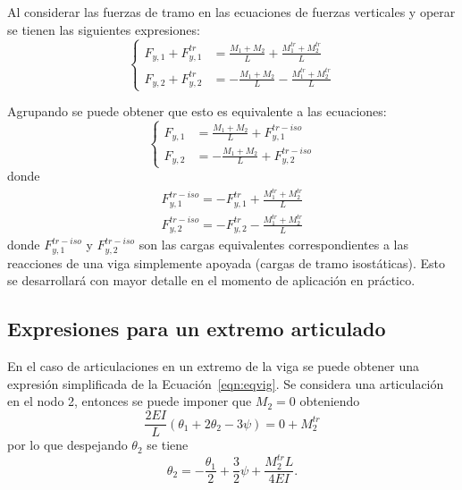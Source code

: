 Al considerar las fuerzas de tramo en las ecuaciones de fuerzas verticales y operar se tienen las siguientes expresiones:
%
\begin{equation}\label{eqn:eccortr}
\left\{
\begin{array}{rl}
\displaystyle
F_{y,1} + F_{y,1}^{tr} & \displaystyle
= \frac{M_1 + M_2}{L} + \frac{M_1^{tr} + M_2^{tr}}{L} \\[5mm]
\displaystyle
F_{y,2} + F_{y,2}^{tr} & \displaystyle
= -\frac{M_1 + M_2}{L} - \frac{M_1^{tr} + M_2^{tr}}{L}
\end{array}
\right.
\end{equation}
%

Agrupando se puede obtener que esto es equivalente a las ecuaciones:
%
\begin{equation}
\boxed{
\left\{
\begin{array}{rl}
\displaystyle
F_{y,1} & \displaystyle
= \frac{M_1 + M_2}{L} + F_{y,1}^{tr-iso} \\[5mm]
\displaystyle
F_{y,2}  & \displaystyle
= -\frac{M_1 + M_2}{L} + F_{y,2}^{tr-iso} 
\end{array}
\right.
}
\end{equation}
%
donde
%
\begin{eqnarray}
F_{y,1}^{tr-iso} = - F_{y,1}^{tr} + \frac{M_1^{tr} + M_2^{tr}}{L} \nonumber\\ 
F_{y,2}^{tr-iso} = -F_{y,2}^{tr}- \frac{M_1^{tr} + M_2^{tr}}{L} \nonumber
\end{eqnarray}
%
donde $F_{y,1}^{tr-iso}$ y $F_{y,2}^{tr-iso}$ son las cargas equivalentes correspondientes a las reacciones de una viga simplemente apoyada (cargas de tramo isostáticas). %
%
Esto se desarrollará con mayor detalle en el momento de aplicación en práctico.



\subsection{Expresiones para un extremo articulado}

En el caso de articulaciones en un extremo de la viga se puede obtener una expresión simplificada de la Ecuación~\eqref{eqn:eqvig}. %
%
Se considera una articulación en el nodo 2, entonces se puede imponer que $M_2=0$ obteniendo  
%
\begin{equation}
\frac{2 EI}{L} \left( \theta_1 + 2  \theta_2 - 3 \psi  \right) = 0 + M_2^{tr}
\end{equation}
%
por lo que despejando $\theta_{2}$ se tiene
%
\begin{equation} \label{eqn:artictheta2}
\theta_2 = -\frac{\theta_1}{2} + \frac{3}{2} \psi + \frac{M_2^{tr} L }{4 EI}.
\end{equation}

